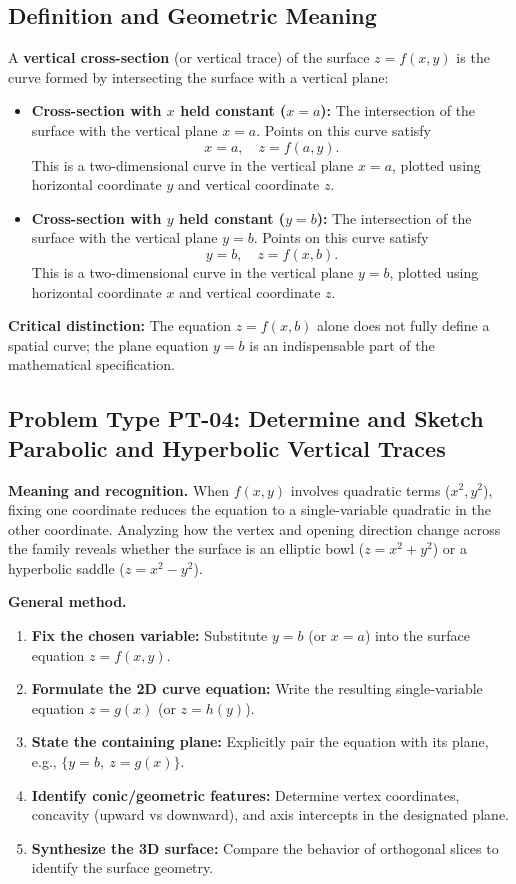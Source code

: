 \documentclass[11pt,letterpaper]{article}
\begin{document}
\subsection{Definition and Geometric Meaning}
A \textbf{vertical cross-section} (or vertical trace) of the surface $z = f(x,y)$ is the curve formed by intersecting the surface with a vertical plane:
\begin{itemize}[leftmargin=*]
    \item \textbf{Cross-section with $x$ held constant ($x = a$):} The intersection of the surface with the vertical plane $x = a$. Points on this curve satisfy
    \[ x = a, \quad z = f(a,y). \]
    This is a two-dimensional curve in the vertical plane $x = a$, plotted using horizontal coordinate $y$ and vertical coordinate $z$.
    \item \textbf{Cross-section with $y$ held constant ($y = b$):} The intersection of the surface with the vertical plane $y = b$. Points on this curve satisfy
    \[ y = b, \quad z = f(x,b). \]
    This is a two-dimensional curve in the vertical plane $y = b$, plotted using horizontal coordinate $x$ and vertical coordinate $z$.
\end{itemize}
\textbf{Critical distinction:} The equation $z = f(x,b)$ alone does not fully define a spatial curve; the plane equation $y = b$ is an indispensable part of the mathematical specification.

\subsection{Problem Type PT-04: Determine and Sketch Parabolic and Hyperbolic Vertical Traces}\label{pt:04}

\textbf{Meaning and recognition.} 
When $f(x,y)$ involves quadratic terms ($x^2, y^2$), fixing one coordinate reduces the equation to a single-variable quadratic in the other coordinate. Analyzing how the vertex and opening direction change across the family reveals whether the surface is an elliptic bowl ($z = x^2+y^2$) or a hyperbolic saddle ($z = x^2-y^2$).

\textbf{General method.}
\begin{enumerate}[leftmargin=*,nosep]
    \item \textbf{Fix the chosen variable:} Substitute $y = b$ (or $x = a$) into the surface equation $z = f(x,y)$.
    \item \textbf{Formulate the 2D curve equation:} Write the resulting single-variable equation $z = g(x)$ (or $z = h(y)$).
    \item \textbf{State the containing plane:} Explicitly pair the equation with its plane, e.g., $\{y = b,\ z = g(x)\}$.
    \item \textbf{Identify conic/geometric features:} Determine vertex coordinates, concavity (upward vs downward), and axis intercepts in the designated plane.
    \item \textbf{Synthesize the 3D surface:} Compare the behavior of orthogonal slices to identify the surface geometry.
\end{enumerate}
\end{document}
